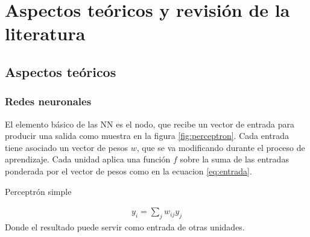 \chapter{Aspectos teóricos y revisión de la literatura}


\section{Aspectos teóricos}
\subsection{Redes neuronales}
El elemento básico de las NN es el nodo, que recibe un vector de entrada para producir una salida como muestra en la figura \ref{fig:perceptron}. Cada entrada tiene asociado un vector de pesos $w$, que se va modificando durante el proceso de aprendizaje. Cada unidad aplica una función $f$ sobre la suma de las entradas ponderada por el vector de pesos como en la ecuacion \ref{eq:entrada}.
\begin{imagen}
	\scalebox{1.5}{}
	\caption{Perceptrón simple}
	\label{fig:perceptron}
\end{imagen}


\begin{eqnarray}
	y_{i} = \sum_{j} w_{ij}y_{j}\label{eq:entrada}
\end{eqnarray}
Donde el resultado puede servir como entrada de otras unidades.

